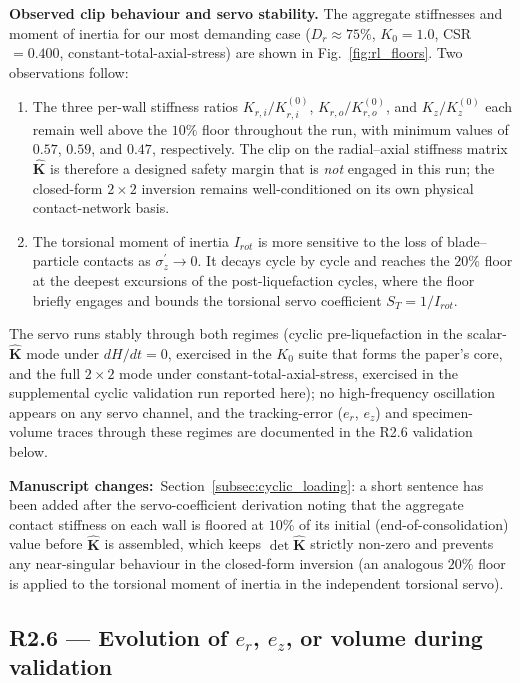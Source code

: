\documentclass[11pt,a4paper]{article}
\newcommand{\changed}[1]{\par\noindent\textbf{Manuscript changes:}\ #1\par}
\newcommand{\Kzero}{\ensuremath{K_0}}
\begin{document}
\medskip
\noindent\textbf{Observed clip behaviour and servo stability.}
The aggregate stiffnesses and moment of inertia for our most
demanding case ($D_r\approx 75\%$, $\Kzero=1.0$, CSR$=0.400$,
constant-total-axial-stress) are shown in
Fig.~\ref{fig:rl_floors}. Two observations follow:
\begin{enumerate}[leftmargin=*,label=(\arabic*),topsep=2pt,itemsep=3pt]
  \item The three per-wall stiffness ratios
    $K_{r,i}/K_{r,i}^{(0)}$, $K_{r,o}/K_{r,o}^{(0)}$, and
    $K_z/K_z^{(0)}$ each remain well above the $10\%$ floor
    throughout the run, with minimum values of $0.57$, $0.59$,
    and $0.47$, respectively. The clip on the radial--axial
    stiffness matrix $\hat{\mathbf{K}}$ is therefore a designed
    safety margin that is \emph{not} engaged in this run; the
    closed-form $2\times 2$ inversion remains well-conditioned
    on its own physical contact-network basis.
  \item The torsional moment of inertia $I_{rot}$ is more
    sensitive to the loss of blade--particle contacts as
    $\sigma_z^{\prime}\!\to\!0$. It decays cycle by cycle and
    reaches the $20\%$ floor at the deepest excursions of the
    post-liquefaction cycles, where the floor briefly engages
    and bounds the torsional servo coefficient
    $S_T=1/I_{rot}$.
\end{enumerate}
The servo runs stably through both regimes (cyclic
pre-liquefaction in the scalar-$\hat{\mathbf{K}}$ mode under
$dH/dt=0$, exercised in the $K_0$ suite that forms the paper's
core, and the full $2\times 2$ mode under constant-total-axial-stress,
exercised in the supplemental cyclic validation run reported here);
no high-frequency oscillation appears on any servo channel, and
the tracking-error ($e_r$, $e_z$) and specimen-volume traces
through these regimes are documented in the R2.6 validation
below.

\changed{Section~\ref{subsec:cyclic_loading}: a short sentence
has been added after the servo-coefficient derivation noting that
the aggregate contact stiffness on each wall is floored at $10\%$
of its initial (end-of-consolidation) value before
$\hat{\mathbf{K}}$ is assembled, which keeps $\det\hat{\mathbf{K}}$
strictly non-zero and prevents any near-singular behaviour in the
closed-form inversion (an analogous $20\%$ floor is applied to the
torsional moment of inertia in the independent torsional servo).}

\subsection*{R2.6 --- Evolution of $e_r$, $e_z$, or volume during validation}
\end{document}
